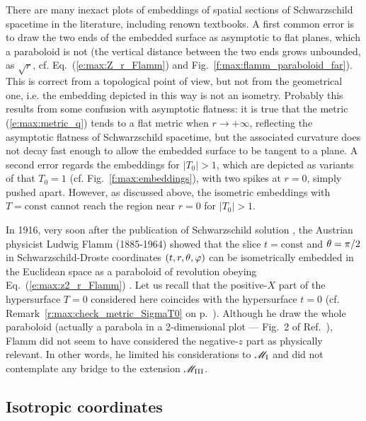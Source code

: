 \begin{remark}
There are many inexact plots of embeddings of spatial sections
of Schwarz\-schild spacetime in the literature, including renown textbooks.
A first common error is to draw the two ends of the embedded surface as asymptotic to flat
planes, which a paraboloid is not (the vertical distance between the two ends grows
unbounded, as $\sqrt{r}$, cf. Eq.~(\ref{e:max:Z_r_Flamm}) and Fig.~\ref{f:max:flamm_paraboloid_far}).
This is correct from a topological point of view,
but not from the geometrical one, i.e. the embedding depicted in this way
is not an isometry. Probably this results from some confusion with asymptotic
flatness: it is true that the metric (\ref{e:max:metric_q}) tends
to a flat metric when $r\rightarrow +\infty$, reflecting the asymptotic
flatness of Schwarzschild spacetime, but the associated curvature does not
decay fast enough to allow the embedded surface to be tangent to a plane.
A second error regards the embeddings for $|T_0|> 1$, which
are depicted as variants of that $T_0=1$ (cf. Fig.~\ref{f:max:embeddings}),
with two spikes at $r=0$, simply pushed apart. However,
as discussed above, the isometric embeddings with $T=\mathrm{const}$
cannot reach the region near $r=0$ for $|T_0|> 1$.
\end{remark}

\begin{hist}
In 1916, very soon after the publication of Schwarzschild solution
\cite{Schwa1916}, the Austrian physicist Ludwig Flamm (1885-1964) showed that the slice $t=\mathrm{const}$
and $\theta=\pi/2$ in Schwarzschild-Droste coordinates $(t,r,\theta,\varphi)$
can be isometrically embedded in the Euclidean space as a paraboloid of
revolution obeying Eq.~(\ref{e:max:z2_r_Flamm}) \cite{Flamm1916}.
Let us recall that the positive-$X$ part of the hypersurface $T=0$ considered here coincides with the
hypersurface $t=0$ (cf. Remark~\ref{r:max:check_metric_SigmaT0} on p.~\pageref{r:max:check_metric_SigmaT0}). Although he draw the whole paraboloid (actually
a parabola in a 2-dimensional plot --- Fig.~2 of Ref.~\cite{Flamm1916}), Flamm did not seem to have considered
the negative-$z$ part as physically relevant. In other words,
he limited his considerations to $\mathscr{M}_{\rm I}$ and did not contemplate any bridge to
the extension $\mathscr{M}_{\rm III}$.
\end{hist}

\subsection{Isotropic coordinates}

